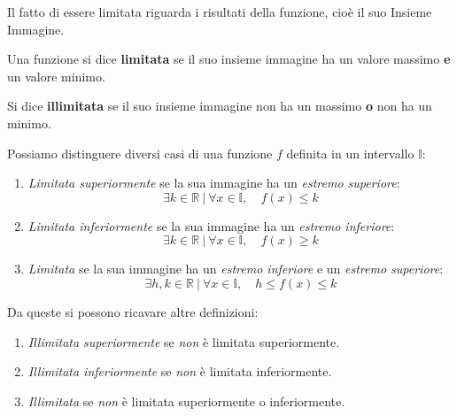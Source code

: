 Il fatto di essere limitata riguarda i risultati della funzione, cioè 
il suo Insieme Immagine.

\begin{definizione}
Una funzione si dice \textbf{limitata} se il suo insieme immagine ha un 
valore massimo \textbf{e} un valore minimo.

Si dice \textbf{illimitata} se il suo insieme immagine non ha un massimo 
\textbf{o} non ha un minimo.
\end{definizione}

Possiamo distinguere diversi casi di una funzione \(f\) definita in un 
intervallo \(\mathbb{I}\):

\begin{enumerate} [nosep]
\item \emph{Limitata superiormente} se la sua immagine ha un 
\emph{estremo superiore}:
\[\exists k \in \mathbb{R} ~|~ \forall x \in \mathbb{I}, \quad f(x) \le k\]
\item \emph{Limitata inferiormente} se la sua immagine ha un 
\emph{estremo inferiore}:
\[\exists k \in \mathbb{R} ~|~ \forall x \in \mathbb{I}, \quad f(x) \ge k\]
\item \emph{Limitata} se la sua immagine ha un 
\emph{estremo inferiore} e un \emph{estremo superiore}: 
\[\exists h, k \in \mathbb{R} ~|~ \forall x \in \mathbb{I}, \quad h \le 
f(x) \le k \]
\end{enumerate}

Da queste si possono ricavare altre definizioni:
\begin{enumerate} [nosep]
\item \emph{Illimitata superiormente} se \emph{non} è limitata superiormente.
\item \emph{Illimitata inferiormente} se \emph{non} è limitata inferiormente.
\item \emph{Illimitata} se \emph{non} è limitata superiormente o inferiormente.
\end{enumerate}

